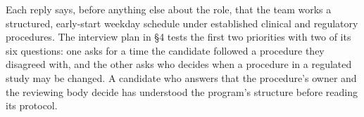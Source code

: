 Each reply says, before anything else about the role, that the team works a
structured, early-start weekday schedule under established clinical and
regulatory procedures. The interview plan in \S4 tests the first two priorities
with two of its six questions: one asks for a time the candidate followed a
procedure they disagreed with, and the other asks who decides when a procedure
in a regulated study may be changed. A candidate who answers that the procedure's
owner and the reviewing body decide has understood the program's structure
before reading its protocol.
